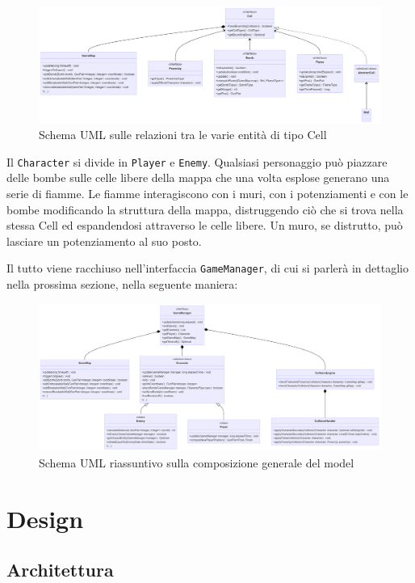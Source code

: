 \documentclass[a4paper,12pt]{report}
\begin{document}
\begin{figure}[h]
\centering{}
\includegraphics[width=\textwidth]{img/interface-cell.png}
\caption{Schema UML sulle relazioni tra le varie entità di tipo Cell}
\end{figure}

Il \verb|Character| si divide in \verb|Player| e \verb|Enemy|. Qualsiasi personaggio può piazzare delle bombe sulle celle libere della mappa che una volta esplose generano una serie di fiamme. Le fiamme interagiscono con i muri, con i potenziamenti e con le bombe modificando la struttura della mappa, distruggendo ciò che si trova nella stessa Cell ed espandendosi attraverso le celle libere. Un muro, se distrutto, può lasciare un potenziamento al suo posto. 

Il tutto viene racchiuso nell'interfaccia \verb|GameManager|, di cui si parlerà in dettaglio nella prossima sezione, nella seguente maniera: 

\begin{figure}[h]
\centering{}
\includegraphics[width=\textwidth]{img/manager-riassunto.png}
\caption{Schema UML riassuntivo sulla composizione generale del model}
\end{figure}

\chapter{Design}

\section{Architettura}
\end{document}
